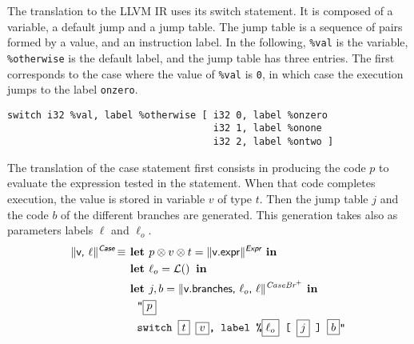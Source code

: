 \documentclass{llncs}
\newcommand{\trad}[2]{\ensuremath{\lVert \textsf{#1} \rVert^{\textit{#2}}}}
\DeclareMathOperator{\isdef}{\equiv}
\DeclareMathOperator{\lbl}{\mathcal{L}()}
\newcommand{\llvm}[1]{\texttt{#1}}
\newcommand{\B}[1]{\textsf{#1}}
\newcommand{\ListOf}[1]{$\mbox{#1}^+$}
\newcommand{\LET}[0]{\textbf{ let }}
\newcommand{\IN}[0]{\textbf{ in }}
\newcommand{\PH}[1]{\framebox{$#1$}}
\newcommand{\sep}[0]{\otimes}
\begin{document}
The translation to the LLVM IR uses its switch statement. It is composed of a
variable, a default jump and a jump table. The jump table is a sequence of pairs
formed by a value, and an instruction label. In the following, \llvm{\%val} is
the variable, \llvm{\%otherwise} is the default label, and the jump table has
three entries. The first corresponds to the case where the value of \llvm{\%val}
is \llvm{0}, in which case the execution jumps to the label \llvm{onzero}.
\begin{verbatim}
switch i32 %val, label %otherwise [ i32 0, label %onzero
                                    i32 1, label %onone
                                    i32 2, label %ontwo ]
\end{verbatim}

The translation of the case statement first consists in producing the code $p$
to evaluate the expression tested in the statement. When that code completes
execution, the value is stored in variable $v$ of type $t$. Then the jump table
$j$ and the code $b$ of the different branches are generated. This generation
takes also as parameters labels $\ell$ and $\ell_o$.
\begin{align*}
  \trad{v, $\ell$}{\B{Case}} \isdef & \LET p \sep v \sep t = \trad{v.expr}{\B{Expr}} \IN \\
  & \LET \ell_o = \lbl \IN \\
  & \LET j, b = \trad{v.branches, $\ell_o$, $\ell$}{\ListOf{CaseBr}} \IN \\
  & \quad \llvm{"\PH{p}} \\
  & \quad \llvm{switch \PH{t} \PH{v}, label \%\PH{\ell_o} [ \PH{j} ] \PH{b}"}
\end{align*}
\end{document}
